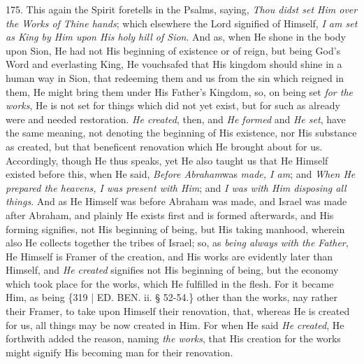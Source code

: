 175. This again the Spirit
foretells in the Psalms, saying, \emph{Thou didst set Him over the Works
of Thine hands}; which elsewhere the Lord signified of Himself, \emph{I
am set as King by Him upon His holy hill of Sion}. And as, when He
shone in the body upon Sion, He had not His beginning of existence or
of reign, but being God's Word and everlasting King, He vouchsafed
that His kingdom should shine in a human way in Sion, that redeeming
them and us from the sin which reigned in them, He might bring them
under His Father's Kingdom, so, on being set \emph{for the works}, He
is not set for things which did not yet exist, but for such as already
were and needed restoration. \emph{He created}, then, and \emph{He formed}
and \emph{He set}, have the same meaning, not denoting the beginning
of His existence, nor His substance as created, but that beneficent
renovation which He brought about for us. Accordingly, though He thus
speaks, yet He also taught us that He Himself existed before this,
when He said, \emph{Before Abraham}was \emph{made, I am}; and \emph{When
He prepared the heavens, I was present with Him}; and \emph{I was with
Him disposing all things}. And as He Himself was before Abraham was
made, and Israel was made after Abraham, and plainly He exists first
and is formed afterwards, and His forming signifies, not His beginning
of being, but His taking manhood, wherein also He collects together
the tribes of Israel; so, as \emph{being always with the Father}, He
Himself is Framer of the creation, and His works are evidently later
than Himself, and \emph{He created} signifies not His beginning of
being, but the economy which took place for the works, which He
fulfilled in the flesh. For it became Him, as being \{319 | ED.
BEN. ii. § 52-54.\} other than the works, nay
rather their Framer, to take upon Himself their renovation, that,
whereas He is created for us, all things may be now created in Him.
For when He said \emph{He created}, He forthwith added the reason,
naming \emph{the works}, that His creation for the works might signify
His becoming man for their renovation.

